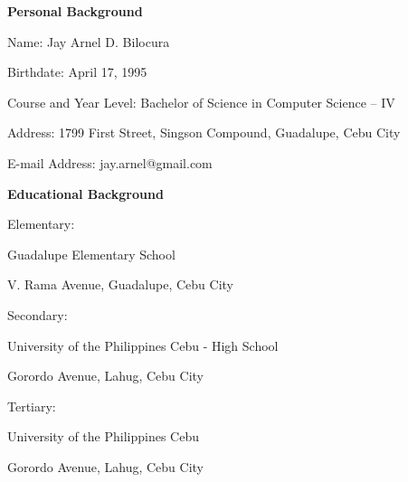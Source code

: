 \begin{profile}
\noindent \textbf{Personal Background}

\noindent Name: Jay Arnel D. Bilocura

\noindent Birthdate: April 17, 1995

\noindent Course and Year Level: Bachelor of Science in Computer Science – IV

\noindent Address: 1799 First Street, Singson Compound, Guadalupe, Cebu City

\noindent E-mail Address: jay.arnel@gmail.com

\bigskip
\noindent \textbf{Educational Background}

\noindent Elementary:

Guadalupe Elementary School

V. Rama Avenue, Guadalupe, Cebu City

\noindent Secondary:

University of the Philippines Cebu - High School

Gorordo Avenue, Lahug, Cebu City

\noindent Tertiary:

University of the Philippines Cebu

Gorordo Avenue, Lahug, Cebu City

\end{profile}
